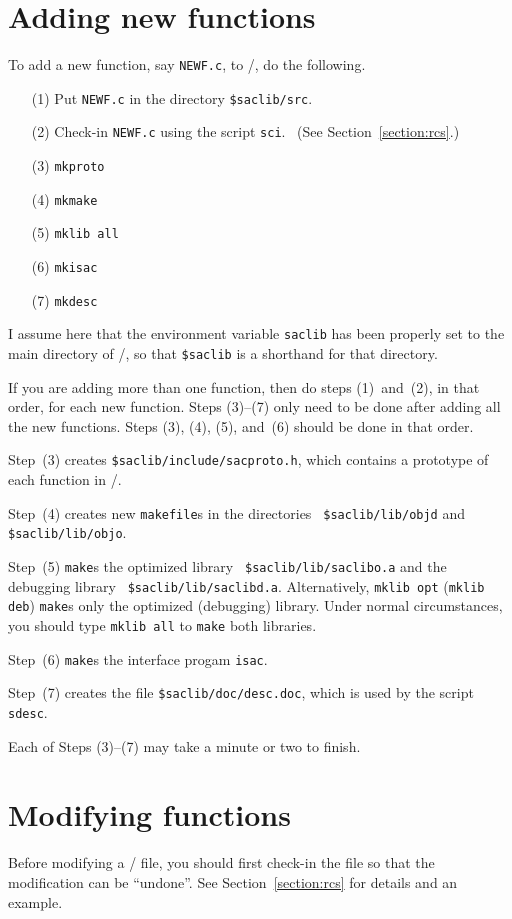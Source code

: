 \section{Adding new functions}

To add a new function, say {\tt NEWF.c}, to \SACLIB/, do the
following.


\begin{enumerate}
\item[(1)] Put {\tt NEWF.c} in the directory {\tt \$saclib/src}.
\item[(2)] Check-in {\tt NEWF.c} using the script {\tt sci}. \ (See
Section~\ref{section:rcs}.)
\item[(3)]  {\tt mkproto}
\item[(4)]  {\tt mkmake}
\item[(5)]  {\tt mklib all}
\item[(6)]  {\tt mkisac}
\item[(7)]  {\tt mkdesc}
\end{enumerate}


I assume here that the environment variable {\tt saclib} has
been properly set to the main directory of \SACLIB/, so that
\verb|$saclib| is a shorthand for that directory.


If you are adding more than one function, then do steps
(1)~and~(2), in that order, for each new function.
Steps (3)--(7) only need to be done after adding all the new
functions.
Steps (3), (4), (5), and~(6) should be done in that order.


Step~(3) creates {\tt \$saclib/include/sacproto.h}, which
contains a prototype of each function in \SACLIB/.


Step~(4) creates new {\tt makefile}s in the directories {\tt
\$saclib/lib/objd} and {\tt \$saclib/\-lib/objo}.


Step~(5) {\tt make}s the optimized library {\tt
\$saclib/lib/saclibo.a} and the debugging library {\tt
\$saclib/lib/saclibd.a}.
Alternatively, {\tt mklib opt} ({\tt mklib deb})
{\tt make}s only the optimized (debugging) library.
Under normal circumstances, you should type {\tt mklib all} to
{\tt make} both libraries.

Step~(6) {\tt make}s the interface progam {\tt isac}.

Step~(7) creates the file {\tt \$saclib/doc/desc.doc}, which is
used by the script {\tt sdesc}.


Each of Steps (3)--(7) may take a minute or two to finish.


\section{Modifying functions}
Before modifying a \SACLIB/ file, you should first check-in the
file so that the modification can be ``undone''.
See Section~\ref{section:rcs} for details and an example.

